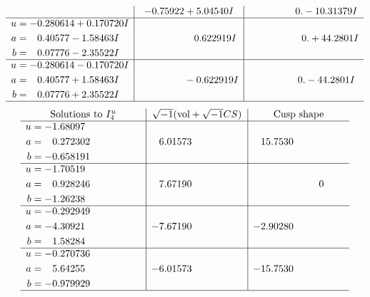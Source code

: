 \documentclass[1p]{elsarticle_modified}
\theoremstyle{definition}
\newcommand{\I}{\sqrt{-1}}
\begin{document}
$$\begin{array}{c|c|c}
 & -0.75922 + 5.04540 I & \phantom{-0.000000 } 0. - 10.31379 I \\ \hline\begin{aligned}
u &= -0.280614 + 0.170720 I \\
a &= \phantom{-}0.40577 - 1.58463 I \\
b &= \phantom{-}0.07776 - 2.35522 I\end{aligned}
 & \phantom{-0.000000 -}0.622919 I & \phantom{-0.000000 -}0. + 44.2801 I \\ \hline\begin{aligned}
u &= -0.280614 - 0.170720 I \\
a &= \phantom{-}0.40577 + 1.58463 I \\
b &= \phantom{-}0.07776 + 2.35522 I\end{aligned}
 & \phantom{-0.000000 } -0.622919 I & \phantom{-0.000000 } 0. - 44.2801 I\\
 \hline 
 \end{array}$$\newpage$$\begin{array}{c|c|c}  
\text{Solutions to }I^u_{4}& \I (\text{vol} + \sqrt{-1}CS) & \text{Cusp shape}\\
 \hline 
\begin{aligned}
u &= -1.68097\phantom{ +0.000000I} \\
a &= \phantom{-}0.272302\phantom{ +0.000000I} \\
b &= -0.658191\phantom{ +0.000000I}\end{aligned}
 & \phantom{-}6.01573\phantom{ +0.000000I} & \phantom{-}15.7530\phantom{ +0.000000I} \\ \hline\begin{aligned}
u &= -1.70519\phantom{ +0.000000I} \\
a &= \phantom{-}0.928246\phantom{ +0.000000I} \\
b &= -1.26238\phantom{ +0.000000I}\end{aligned}
 & \phantom{-}7.67190\phantom{ +0.000000I} & \phantom{-0.000000 } 0 \\ \hline\begin{aligned}
u &= -0.292949\phantom{ +0.000000I} \\
a &= -4.30921\phantom{ +0.000000I} \\
b &= \phantom{-}1.58284\phantom{ +0.000000I}\end{aligned}
 & -7.67190\phantom{ +0.000000I} & -2.90280\phantom{ +0.000000I} \\ \hline\begin{aligned}
u &= -0.270736\phantom{ +0.000000I} \\
a &= \phantom{-}5.64255\phantom{ +0.000000I} \\
b &= -0.979929\phantom{ +0.000000I}\end{aligned}
 & -6.01573\phantom{ +0.000000I} & -15.7530\phantom{ +0.000000I}\\
 \hline 
 \end{array}$$\newpage
\end{document}
